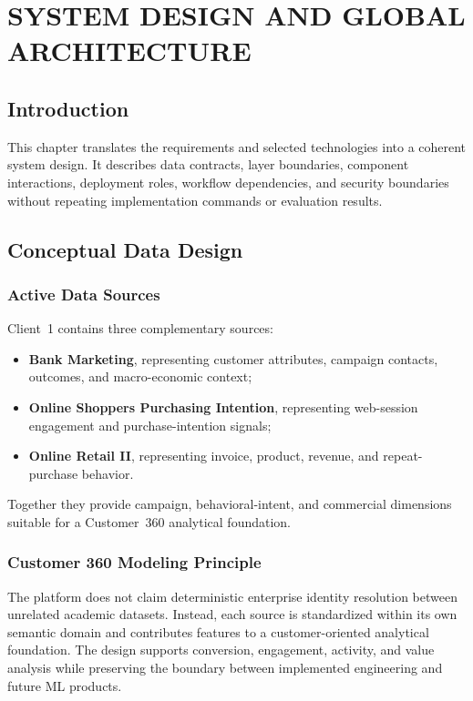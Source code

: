 \clearpage
\chapter{SYSTEM DESIGN AND GLOBAL ARCHITECTURE}

\section{Introduction}
This chapter translates the requirements and selected technologies into a coherent system design. It describes data contracts, layer boundaries, component interactions, deployment roles, workflow dependencies, and security boundaries without repeating implementation commands or evaluation results.

\section{Conceptual Data Design}

\subsection{Active Data Sources}
Client~1 contains three complementary sources:
\begin{itemize}
    \item \textbf{Bank Marketing}, representing customer attributes, campaign contacts, outcomes, and macro-economic context;
    \item \textbf{Online Shoppers Purchasing Intention}, representing web-session engagement and purchase-intention signals;
    \item \textbf{Online Retail II}, representing invoice, product, revenue, and repeat-purchase behavior.
\end{itemize}
Together they provide campaign, behavioral-intent, and commercial dimensions suitable for a Customer~360 analytical foundation.

\subsection{Customer 360 Modeling Principle}
The platform does not claim deterministic enterprise identity resolution between unrelated academic datasets. Instead, each source is standardized within its own semantic domain and contributes features to a customer-oriented analytical foundation. The design supports conversion, engagement, activity, and value analysis while preserving the boundary between implemented engineering and future ML products.

